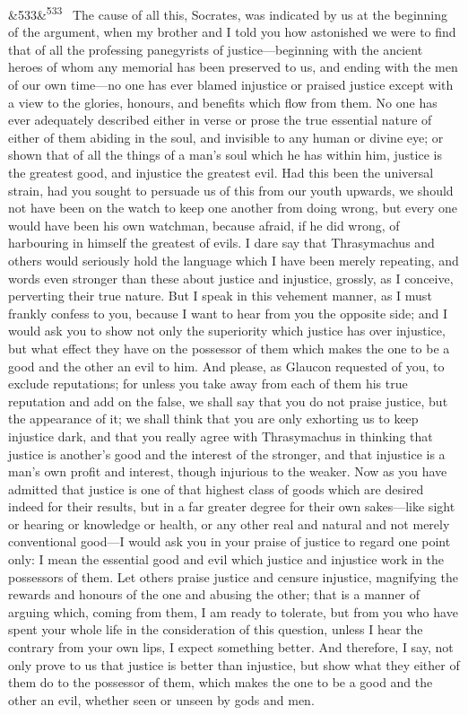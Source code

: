 \documentclass[12pt]{article}
\newcommand{\para}[1][]{\par\noindent\ifx&#1&\else\textsuperscript{\footnotesize #1}~\fi}
\begin{document}
\para[533] The cause of all this, Socrates, was indicated by us at the beginning of the argument, when my brother and I told you how astonished we were to find that of all the professing panegyrists of justice---beginning with the ancient heroes of whom any memorial has been preserved to us, and ending with the men of our own time---no one has ever blamed injustice or praised justice except with a view to the glories, honours, and benefits which flow from them. No one has ever adequately described either in verse or prose the true essential nature of either of them abiding in the soul, and invisible to any human or divine eye; or shown that of all the things of a man's soul which he has within him, justice is the greatest good, and injustice the greatest evil. Had this been the universal strain, had you sought to persuade us of this from our youth upwards, we should not have been on the watch to keep one another from doing wrong, but every one would have been his own watchman, because afraid, if he did wrong, of harbouring in himself the greatest of evils. I dare say that Thrasymachus and others would seriously hold the language which I have been merely repeating, and words even stronger than these about justice and injustice, grossly, as I conceive, perverting their true nature. But I speak in this vehement manner, as I must frankly confess to you, because I want to hear from you the opposite side; and I would ask you to show not only the superiority which justice has over injustice, but what effect they have on the possessor of them which makes the one to be a good and the other an evil to him. And please, as Glaucon requested of you, to exclude reputations; for unless you take away from each of them his true reputation and add on the false, we shall say that you do not praise justice, but the appearance of it; we shall think that you are only exhorting us to keep injustice dark, and that you really agree with Thrasymachus in thinking that justice is another's good and the interest of the stronger, and that injustice is a man's own profit and interest, though injurious to the weaker. Now as you have admitted that justice is one of that highest class of goods which are desired indeed for their results, but in a far greater degree for their own sakes---like sight or hearing or knowledge or health, or any other real and natural and not merely conventional good---I would ask you in your praise of justice to regard one point only: I mean the essential good and evil which justice and injustice work in the possessors of them. Let others praise justice and censure injustice, magnifying the rewards and honours of the one and abusing the other; that is a manner of arguing which, coming from them, I am ready to tolerate, but from you who have spent your whole life in the consideration of this question, unless I hear the contrary from your own lips, I expect something better. And therefore, I say, not only prove to us that justice is better than injustice, but show what they either of them do to the possessor of them, which makes the one to be a good and the other an evil, whether seen or unseen by gods and men.
\end{document}
